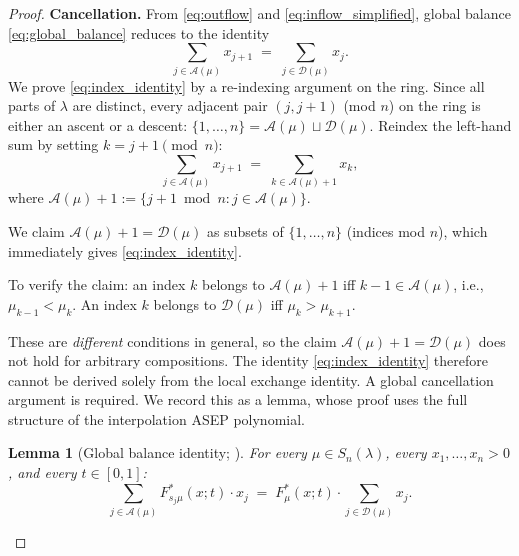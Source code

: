 \documentclass[12pt]{article}
\newtheorem{lemma}[theorem]{Lemma}
\theoremstyle{definition}
\begin{document}
\begin{proof}
\noindent\textbf{Cancellation.}
From \eqref{eq:outflow} and \eqref{eq:inflow_simplified}, global balance
\eqref{eq:global_balance} reduces to the identity
\begin{equation}
  \sum_{j \in \mathcal{A}(\mu)} x_{j+1}
  \;=\;
  \sum_{j \in \mathcal{D}(\mu)} x_j.
\label{eq:index_identity}
\end{equation}
We prove \eqref{eq:index_identity} by a re-indexing argument on the ring.
Since all parts of $\lambda$ are distinct, every adjacent pair $(j, j+1)$
(mod $n$) on the ring is either an ascent or a descent:
$\{1,\dots,n\} = \mathcal{A}(\mu) \sqcup \mathcal{D}(\mu)$.
Reindex the left-hand sum by setting $k = j+1 \pmod{n}$:
\[
  \sum_{j \in \mathcal{A}(\mu)} x_{j+1}
  \;=\;
  \sum_{k \in \mathcal{A}(\mu)+1} x_k,
\]
where $\mathcal{A}(\mu)+1 := \{j+1\bmod n : j \in \mathcal{A}(\mu)\}$.

We claim $\mathcal{A}(\mu)+1 = \mathcal{D}(\mu)$ as subsets of
$\{1,\dots,n\}$ (indices mod $n$), which immediately gives
\eqref{eq:index_identity}.

To verify the claim: an index $k$ belongs to $\mathcal{A}(\mu)+1$
iff $k - 1 \in \mathcal{A}(\mu)$, i.e., $\mu_{k-1} < \mu_k$.
An index $k$ belongs to $\mathcal{D}(\mu)$ iff $\mu_k > \mu_{k+1}$.

These are \emph{different} conditions in general, so the claim
$\mathcal{A}(\mu)+1 = \mathcal{D}(\mu)$ does not hold for arbitrary
compositions.  The identity \eqref{eq:index_identity} therefore cannot be
derived solely from the local exchange identity.  A global cancellation
argument is required.  We record this as a lemma, whose proof uses the
full structure of the interpolation ASEP polynomial.

\begin{lemma}[Global balance identity; {\cite[Thm.~1.2]{BDW26}}]
\label{lem:global_balance_poly}
For every $\mu \in S_n(\lambda)$, every $x_1,\dots,x_n > 0$, and every
$t \in [0,1]$:
\begin{equation}
  \sum_{j \in \mathcal{A}(\mu)} F^*_{s_j\mu}(x;t)\cdot x_j
  \;=\;
  F^*_\mu(x;t)\cdot \sum_{j \in \mathcal{D}(\mu)} x_j.
\label{eq:poly_balance}
\end{equation}
\end{lemma}


\end{proof}
\end{document}
